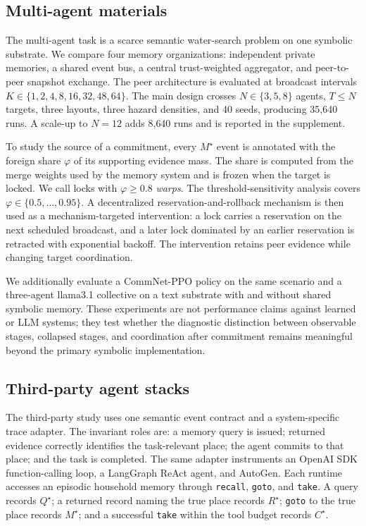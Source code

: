 \documentclass[letterpaper]{article} %
\newcommand{\method}[1]{\texttt{#1}}
\begin{document}
\subsection{Multi-agent materials}

The multi-agent task is a scarce semantic water-search problem on one symbolic substrate. We compare four memory organizations: independent private memories, a shared event bus, a central trust-weighted aggregator, and peer-to-peer snapshot exchange. The peer architecture is evaluated at broadcast intervals $K\in\{1,2,4,8,16,32,48,64\}$. The main design crosses $N\in\{3,5,8\}$ agents, $T\leq N$ targets, three layouts, three hazard densities, and 40 seeds, producing 35{,}640 runs. A scale-up to $N=12$ adds 8{,}640 runs and is reported in the supplement.

To study the source of a commitment, every $M^\star$ event is annotated with the foreign share $\varphi$ of its supporting evidence mass. The share is computed from the merge weights used by the memory system and is frozen when the target is locked. We call locks with $\varphi\geq0.8$ \emph{warps}. The threshold-sensitivity analysis covers $\varphi\in\{0.5,\ldots,0.95\}$. A decentralized reservation-and-rollback mechanism is then used as a mechanism-targeted intervention: a lock carries a reservation on the next scheduled broadcast, and a later lock dominated by an earlier reservation is retracted with exponential backoff. The intervention retains peer evidence while changing target coordination.

We additionally evaluate a CommNet-PPO policy on the same scenario and a three-agent llama3.1 collective on a text substrate with and without shared symbolic memory. These experiments are not performance claims against learned or LLM systems; they test whether the diagnostic distinction between observable stages, collapsed stages, and coordination after commitment remains meaningful beyond the primary symbolic implementation.

\subsection{Third-party agent stacks}

The third-party study uses one semantic event contract and a system-specific trace adapter. The invariant roles are: a memory query is issued; returned evidence correctly identifies the task-relevant place; the agent commits to that place; and the task is completed. The same adapter instruments an OpenAI SDK function-calling loop, a LangGraph ReAct agent, and AutoGen. Each runtime accesses an episodic household memory through \method{recall}, \method{goto}, and \method{take}. A query records $Q^\star$; a returned record naming the true place records $R^\star$; \method{goto} to the true place records $M^\star$; and a successful \method{take} within the tool budget records $C^\star$.
\end{document}
